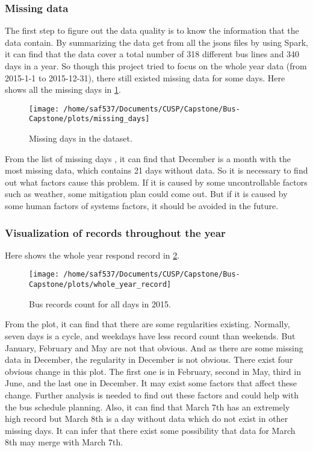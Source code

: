 \documentclass[12pt]{report}
\begin{document}
 \subsubsection*{Missing data}
 
  The first step to figure out the data quality is to know the information that the data contain. By summarizing the data get from all the jsons files by using Spark, it can find that the data cover a total number of 318 different bus lines and 340 days in a year. So though this project tried to focus on the whole year data (from 2015-1-1 to 2015-12-31), there still existed missing data for some days. Here shows all the missing days in \ref{m_days}.
  
  \begin{figure}[!ht]
  \caption{Missing days in the dataset.}
  \label{m_days}
  \centering
    \texttt{[image: /home/saf537/Documents/CUSP/Capstone/Bus-Capstone/plots/missing\_days]}
\end{figure}

      From the list of missing days , it can find that December is a month with the most missing data, which contains 21 days without data. So it is necessary to find out what factors cause this problem. If it is caused by some uncontrollable factors such as weather, some mitigation plan could come out. But if it is caused by some human factors of systems factors, it should be avoided in the future.
      
      \subsubsection*{Visualization of records throughout the year}
      
        Here shows the whole year respond record in \ref{m_alldays}.



\begin{figure}[!ht]
  \caption{Bus records count for all days in 2015.}
  \label{m_alldays}
  \centering
    \texttt{[image: /home/saf537/Documents/CUSP/Capstone/Bus-Capstone/plots/whole\_year\_record]}
\end{figure}

   From the plot, it can find that there are some regularities existing. Normally, seven days is a cycle, and weekdays have less record count than weekends. But January, February and May are not that obvious. And as there are some missing data in December, the regularity in December is not obvious. 
      There exist four obvious change in this plot. The first one is in February, second in May, third in June, and the last one in December. It may exist some factors that affect these change. Further analysis is needed to find out these factors and could help with the bus schedule planning.
      Also, it can find that March 7th has an extremely high record but March 8th is a day without data which do not exist in other missing days. It can infer that there exist some possibility that data for March 8th may merge with March 7th.
      
\end{document}
